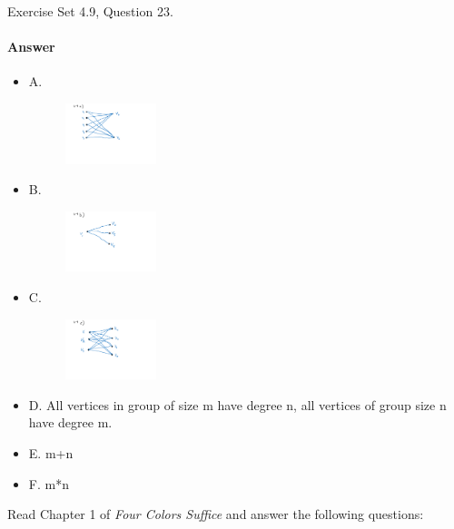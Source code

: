 \documentclass{article}
\begin{document}
Exercise Set 4.9, Question 23.

\paragraph{Answer}
\begin{itemize}

	\item A.
		\begin{figure}[h]
		\centering
			\includegraphics[width=0.25\textwidth]{H_2-4_a}
		\end{figure}

	\item B.
		\begin{figure}[h]
		\centering
			\includegraphics[width=0.25\textwidth]{H_2-4_b}
		\end{figure}	

	\item C.
		\begin{figure}[h]
		\centering
			\includegraphics[width=0.25\textwidth]{H_2-4_c}
		\end{figure}

	\item D.
		All vertices in group of size m have degree n, all vertices of group size n have degree m.

	\item E.
		m+n
	\item F.
		m*n


\end{itemize}

Read Chapter 1 of \emph{Four Colors Suffice} and answer the following questions:
\end{document}
